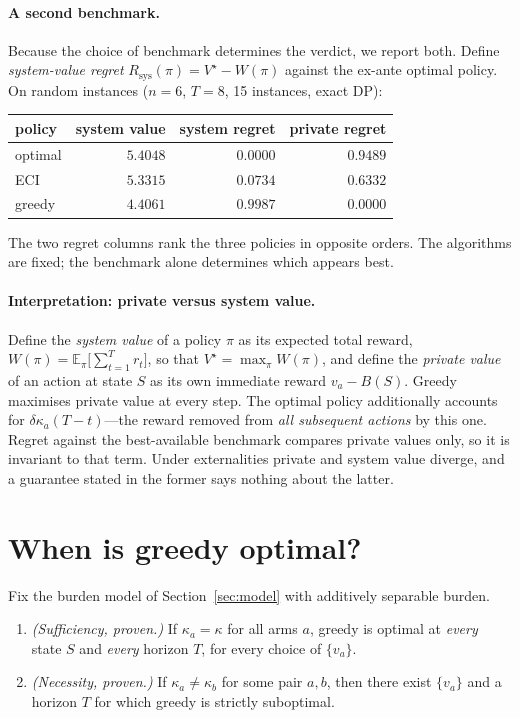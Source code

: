 \paragraph{A second benchmark.} Because the choice of benchmark determines the
verdict, we report both. Define \emph{system-value regret} $R_{\mathrm{sys}}(\pi) =
V^\star - W(\pi)$ against the ex-ante optimal policy. On random instances ($n=6$,
$T=8$, 15 instances, exact DP):

\begin{center}
\begin{tabular}{lrrr}
\toprule
policy & system value & system regret & private regret \\
\midrule
optimal & $5.4048$ & $0.0000$ & $0.9489$ \\
ECI & $5.3315$ & $0.0734$ & $0.6332$ \\
greedy & $4.4061$ & $0.9987$ & $\mathbf{0.0000}$ \\
\bottomrule
\end{tabular}
\end{center}

The two regret columns rank the three policies in opposite orders. The algorithms
are fixed; the benchmark alone determines which appears best.

\paragraph{Interpretation: private versus system value.} Define the \emph{system
value} of a policy $\pi$ as its expected total reward,
$W(\pi) = \mathbb{E}_\pi\big[\sum_{t=1}^{T} r_t\big]$, so that
$V^\star = \max_\pi W(\pi)$, and define the \emph{private value} of an action at
state $S$ as its own immediate reward $v_a - B(S)$. Greedy maximises private value
at every step. The optimal policy additionally accounts for
$\delta\kappa_a(T-t)$---the reward removed from \emph{all subsequent actions} by
this one. Regret against the best-available benchmark compares private values only,
so it is invariant to that term. Under externalities private and system value
diverge, and a guarantee stated in the former says nothing about the latter.

\section{When is greedy optimal?}

\begin{theorem}[Characterisation]
\label{thm:char}
Fix the burden model of Section~\ref{sec:model} with additively separable burden.
\begin{enumerate}
\item[(i)] \emph{(Sufficiency, proven.)} If $\kappa_a = \kappa$ for all arms $a$,
greedy is optimal at \emph{every} state $S$ and \emph{every} horizon $T$, for
every choice of $\{v_a\}$.
\item[(ii)] \emph{(Necessity, proven.)} If $\kappa_a \neq \kappa_b$ for some pair
$a,b$, then there exist $\{v_a\}$ and a horizon $T$ for which greedy is strictly
suboptimal.
\end{enumerate}
\end{theorem}

